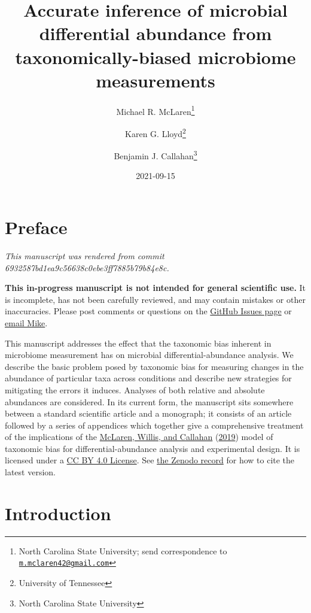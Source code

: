 \documentclass[
]{article}
\title{Accurate inference of microbial differential abundance from taxonomically-biased microbiome measurements}
\author{Michael R. McLaren\footnote{North Carolina State University; send correspondence to \href{mailto:m.mclaren42@gmail.com}{\nolinkurl{m.mclaren42@gmail.com}}} \and Karen G. Lloyd\footnote{University of Tennessee} \and Benjamin J. Callahan\footnote{North Carolina State University}}
\date{2021-09-15}
\theoremstyle{definition}
\theoremstyle{definition}
\theoremstyle{definition}
\theoremstyle{definition}
\theoremstyle{remark}
\begin{document}
\maketitle

{
\setcounter{tocdepth}{2}
\tableofcontents
}
\hypertarget{preface}{%
\section*{Preface}\label{preface}}

\emph{This manuscript was rendered from commit 6932587bd1ea9c56638c0ebe3ff7885b79b84e8c.}

\leavevmode{}%
\textbf{This in-progress manuscript is not intended for general scientific use.}
It is incomplete, has not been carefully reviewed, and may contain mistakes or other inaccuracies.
Please post comments or questions on the \href{https://github.com/mikemc/differential-abundance-theory/issues}{GitHub Issues page} or \href{m.mclaren42@gmail.com}{email Mike}.

This manuscript addresses the effect that the taxonomic bias inherent in microbiome measurement has on microbial differential-abundance analysis.
We describe the basic problem posed by taxonomic bias for measuring changes in the abundance of particular taxa across conditions and describe new strategies for mitigating the errors it induces.
Analyses of both relative and absolute abundances are considered.
In its current form, the manuscript sits somewhere between a standard scientific article and a monograph;
it consists of an article followed by a series of appendices which together give a comprehensive treatment of the implications of the \protect\hyperlink{ref-mclaren2019cons}{McLaren, Willis, and Callahan} (\protect\hyperlink{ref-mclaren2019cons}{2019}) model of taxonomic bias for differential-abundance analysis and experimental design.
It is licensed under a \href{https://creativecommons.org/licenses/by/4.0/}{CC BY 4.0 License}.
See \href{https://doi.org/10.5281/zenodo.4552717}{the Zenodo record} for how to cite the latest version.

\hypertarget{introduction}{%
\section{Introduction}\label{introduction}}
\end{document}
